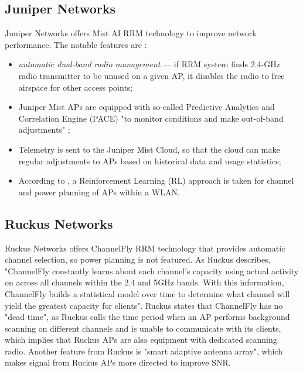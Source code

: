\subsection{Juniper Networks}
Juniper Networks offers Mist AI RRM technology to improve network performance. The notable features are \cite{junipernetworksUnderstandingRadioResource2023,RadioManagementTechnology}:
\begin{itemize}
    \item \textit{automatic dual-band radio management} — if RRM system finds 2.4-GHz radio transmitter to be unused on a given AP, it disables the radio to free airspace for other access points;
    \item Juniper Mist APs are equipped with so-called Predictive Analytics and Correlation Engine (PACE) "to monitor conditions and make out-of-band adjustments" \cite{RadioManagementTechnology};
    \item Telemetry is sent to the Juniper Mist Cloud, so that the cloud can make regular adjustments to APs based on historical data and usage statistics;
    \item According to \cite{junipernetworksUnderstandingRadioResource2023}, a Reinforcement Learning (RL) approach is taken for channel and power planning of APs within a WLAN.
\end{itemize}

\subsection{Ruckus Networks}
Ruckus Networks offers \cite{RuckusChannelFlyFeature2023} ChannelFly RRM technology that provides automatic channel selection, so power planning is not featured. As Ruckus describes, "ChannelFly constantly learns about each channel's capacity using actual activity on across all channels within the 2.4 and 5GHz bands. With this information, ChannelFly builds a statistical model over time to determine what channel will yield the greatest capacity for clients". Ruckus states that ChannelFly has no "dead time", as Ruckus calls the time period when an AP performs background scanning on different channels and is unable to communicate with its clients, which implies that Ruckus APs are also equipment with dedicated scanning radio.
Another feature from Ruckus is "smart adaptive antenna array", which makes signal from Ruckus APs more directed to improve SNR.

